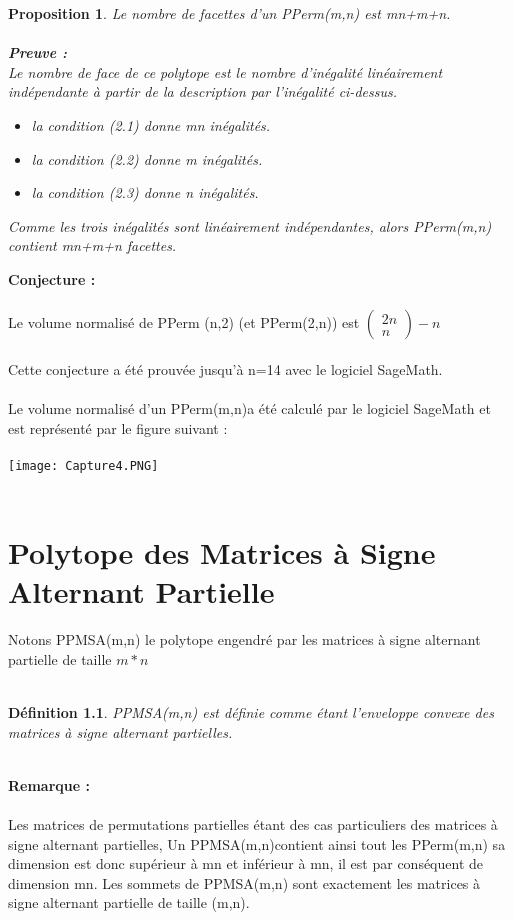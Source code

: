 \documentclass{book}
\newtheorem{petit_nom1}{Proposition}
\newtheorem{petit_nom2}{Définition}[chapter]
\begin{document}
 \begin{petit_nom1}
 Le nombre de facettes d'un PPerm(m,n) est mn+m+n.\\\\
 \textbf{Preuve :}\\
 Le nombre de face de ce polytope est le nombre d'inégalité linéairement indépendante à partir de la description par l'inégalité ci-dessus. \\
 \begin{itemize}
 \item la condition (2.1) donne mn inégalités.
 \item la condition (2.2) donne m inégalités.
 \item la condition (2.3) donne n inégalités.
 \end{itemize}
 Comme les trois inégalités sont linéairement indépendantes, alors PPerm(m,n) contient mn+m+n facettes. 
 \end{petit_nom1} 
 \textbf{Conjecture : }\\\\
 Le volume normalisé de PPerm (n,2) (et PPerm(2,n)) est $\begin{pmatrix}
 2n\\n
 \end{pmatrix}  - n$ \\\\
 Cette conjecture a été prouvée jusqu'à n=14 avec le logiciel SageMath. \\\\
 Le volume normalisé d'un PPerm(m,n)a été calculé par le logiciel SageMath et est représenté par le figure suivant :\\\\
 \texttt{[image: Capture4.PNG]} \\\\ 
 
\chapter{Polytope des Matrices à Signe Alternant Partielle}
Notons PPMSA(m,n) le polytope engendré par les matrices à signe alternant partielle de taille $m*n$ \\\\
\begin{petit_nom2}
PPMSA(m,n) est définie comme étant l'enveloppe convexe des matrices à signe alternant partielles. \\\\
\end{petit_nom2} 
\textbf{Remarque :}\\\\
Les matrices de permutations partielles étant des cas particuliers des matrices à signe alternant partielles, Un PPMSA(m,n)contient ainsi tout les PPerm(m,n) sa dimension est donc supérieur à mn et inférieur à mn, il est par conséquent de dimension mn. 
Les sommets de PPMSA(m,n) sont exactement les matrices à signe alternant partielle de taille (m,n).
\end{document}
